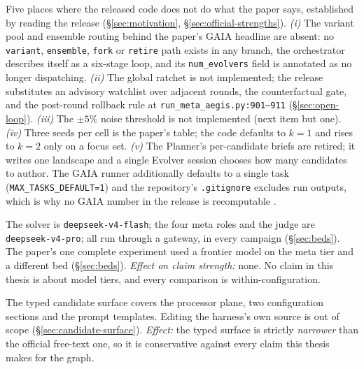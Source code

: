 \begin{description}[leftmargin=1.4em,style=nextline,itemsep=5pt]

  \item[\textnormal{\textbf{Paper-versus-release divergences.}}] Five
        places where the released code does not do what the paper says,
        established by reading the release (\S\ref{sec:motivation},
        \S\ref{sec:official-strengths}). \emph{(i)} The variant pool and
        ensemble routing behind the paper's GAIA headline are absent: no
        \texttt{variant}, \texttt{ensemble}, \texttt{fork} or
        \texttt{retire} path exists in any branch, the orchestrator
        describes itself as a six-stage loop, and its \texttt{num\_evolvers}
        field is annotated as no longer dispatching. \emph{(ii)} The global
        ratchet is not implemented; the release substitutes an advisory
        watchlist over adjacent rounds, the counterfactual gate, and the
        post-round rollback rule at \texttt{run\_meta\_aegis.py:901--911}
        (\S\ref{sec:open-loop}). \emph{(iii)} The $\pm 5\%$ noise threshold
        is not implemented (next item but one). \emph{(iv)} Three seeds per
        cell is the paper's table; the code defaults to $k{=}1$ and rises
        to $k{=}2$ only on a focus set. \emph{(v)} The Planner's
        per-candidate briefs are retired; it writes one landscape and a
        single Evolver session chooses how many candidates to author. The
        GAIA runner additionally defaults to a single task
        (\texttt{MAX\_TASKS\_DEFAULT=1}) and the repository's
        \texttt{.gitignore} excludes run outputs, which is why no GAIA
        number in the release is recomputable .

  \item[\textnormal{\textbf{Model tier.}}] \begingroup\sloppy The solver is
        \texttt{deepseek-v4-flash}; the four meta roles and the judge are
        \texttt{deepseek-v4-pro}; all run through a gateway, in every
        campaign (\S\ref{sec:beds}). The paper's one
        complete experiment used a frontier model on the meta tier and a
        different bed (\S\ref{sec:beds}). \emph{Effect on claim strength:}
        none. No claim in this thesis is about model tiers, and every
        comparison is within-configuration.\par\endgroup

  \item[\textnormal{\textbf{Edit-surface coverage.}}] The typed candidate
        surface covers the processor plane, two configuration sections and
        the prompt templates. Editing the harness's own source is out of
        scope (\S\ref{sec:candidate-surface}). \emph{Effect:} the typed
        surface is strictly \emph{narrower} than the official free-text
        one, so it is conservative against every claim this thesis makes
        for the graph.


\end{description}
